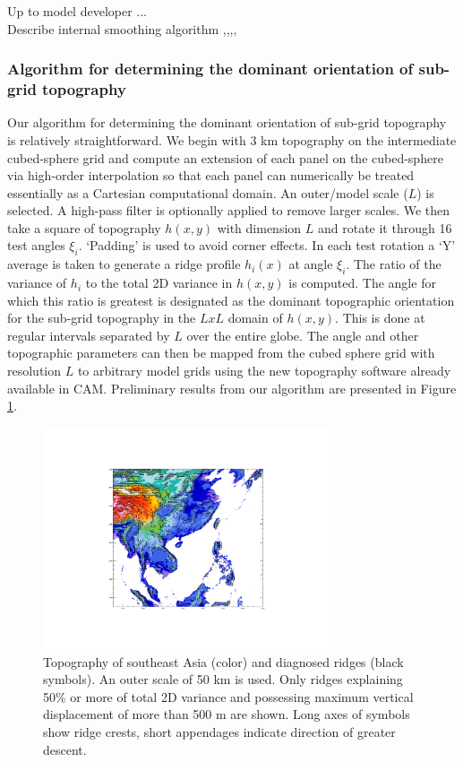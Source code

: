 \documentclass[gmd]{copernicus}
\begin{document}
Up to model developer ...\\

Describe internal smoothing algorithm ,,,,

\subsubsection{Algorithm for determining the dominant orientation of sub-grid topography}\label{sec:sub-orient}
Our algorithm for determining the dominant orientation of sub-grid topography is relatively straightforward.  We begin with 3 km topography on the intermediate cubed-sphere grid and compute an extension of each panel on the cubed-sphere via high-order interpolation so that each panel can numerically be treated essentially as a Cartesian computational domain. An outer/model scale ($L$) is selected.  A high-pass filter is optionally applied to remove larger scales.  We then take a square of topography $h(x,y)$ with dimension $L$ and rotate it through 16 test angles $\xi_i$.  `Padding' is used to avoid corner effects.  In each test rotation a `Y' average is taken to generate a ridge profile $h_i(x)$ at angle $\xi_i$.  The ratio of the variance of $h_i$ to the total 2D variance in $h(x,y)$ is computed.  The angle for which this ratio is greatest is designated as the dominant topographic orientation for the sub-grid topography in the $LxL$ domain of $h(x,y)$.  This is done at regular intervals separated by $L$ over the entire globe.  The angle and other topographic parameters can then be mapped from the cubed sphere grid with resolution $L$ to arbitrary model grids using the new topography software already available in CAM.  Preliminary results from our algorithm are presented in Figure \ref{fig:dsgso}.
\begin{figure}[tb]
\center\includegraphics[width=20pc,angle=0]{fig/dominant-sub-grid-oro.pdf}
  \caption{Topography of southeast Asia (color) and diagnosed ridges (black symbols). An outer scale of 50 km is used. Only ridges explaining 50\% or more of total 2D variance and possessing maximum vertical displacement of more than 500 m are shown.  Long axes of symbols show ridge crests, short appendages indicate direction of greater descent.}\label{fig:dsgso}
\end{figure} 
\end{document}
